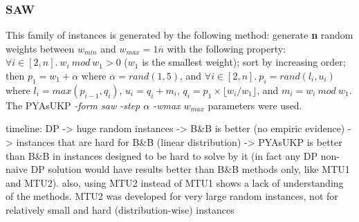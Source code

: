 \subsubsection{SAW}
This family of instances is generated by the following method: generate \textbf{n} random weights between \(w_{min}\) and \(w_{max} = 1\overline{n}\) with the following property: \(\forall i \in [2, n].~w_i~mod~w_1 > 0\) (\(w_1\) is the smallest weight); sort by increasing order; then \(p_1 = w_1 + \alpha\) where \(\alpha = rand(1,5)\), and \(\forall i \in [2, n].~p_i = rand(l_i, u_i)\) where \(l_i = max(p_{i-1}, q_i)\), \(u_i = q_i + m_i\), \(q_i = p_1 \times \lfloor w_i / w_1 \rfloor \), and \(m_i = w_i~mod~w_1\). The PYAsUKP \emph{-form saw -step \(\alpha\) -wmax \(w_{max}\)} parameters were used.

	timeline: DP -> huge random instances -> B\&B is better (no empiric evidence) -> instances that are hard for B\&B (linear distribution) -> PYAsUKP is better than B\&B in instances designed to be hard to solve by it (in fact any DP non-naive DP solution would have results better than B\&B methods only, like MTU1 and MTU2). also, using MTU2 instead of MTU1 shows a lack of understanding of the methods. MTU2 was developed for very large random instances, not for relatively small and hard (distribution-wise) instances

